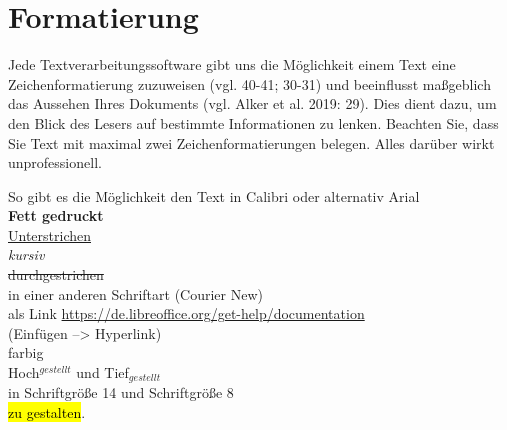 \documentclass[a4paper, 11pt]{scrartcl}
\begin{document}
	\section{Formatierung} %
	\begin{justify}
		Jede Textverarbeitungssoftware gibt uns die Möglichkeit einem Text eine Zeichenformatierung zuzuweisen (vgl. 40-41; 30-31) und beeinflusst maßgeblich das Aussehen Ihres Dokuments (vgl. Alker et al. 2019: 29). Dies dient dazu, um den Blick des Lesers auf bestimmte Informationen zu lenken. Beachten Sie, dass Sie Text mit maximal zwei Zeichenformatierungen belegen. Alles darüber wirkt unprofessionell.
	\end{justify}
	\begin{flushleft}
		So gibt es die Möglichkeit den Text in Calibri oder alternativ {\normalfont{}Arial} \vspace{2mm} \\
		\textbf{Fett gedruckt} \vspace{2mm} \\
		\underline{Unterstrichen} \vspace{2mm} \\
		\textit{kursiv} \vspace{2mm} \\
		\sout{durchgestrichen} \vspace{2mm} \\
		{\normalfont{}in einer anderen Schriftart (Courier New)} \vspace{2mm} \\
		als Link \url{https://de.libreoffice.org/get-help/documentation} \\
		(Einfügen --> Hyperlink) \vspace{8mm} \\
		{\color{red}farbig} \vspace{2mm} \\
		Hoch$^{gestellt}$ und Tief$_{gestellt}$ \vspace{2mm} \\
		in {\Large Schriftgröße 14} und {\scriptsize Schriftgröße 8} \vspace{2mm} \\
		\hl{zu gestalten}.
	\end{flushleft}
	
	\newpage
\end{document}

